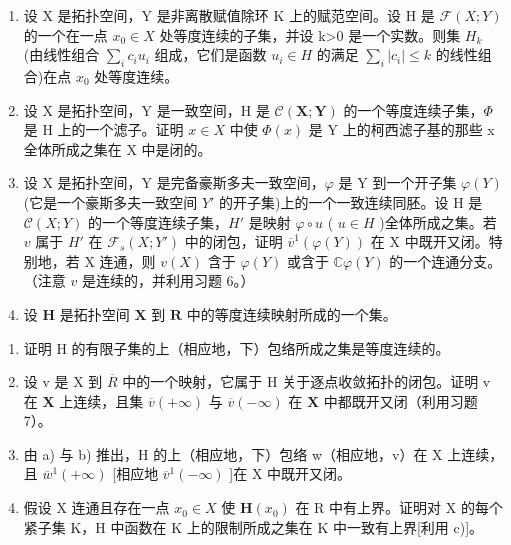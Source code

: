 \begin{enumerate}
\def\labelenumi{\arabic{enumi})}
\setcounter{enumi}{4}
\item
  设 X 是拓扑空间，Y 是非离散赋值除环 K 上的赋范空间。设 H 是 \(\mathcal{F}(X;Y)\) 的一个在一点 \(x_{0}\in X\) 处等度连续的子集，并设 k\textgreater0 是一个实数。则集 \(H_{k}\) (由线性组合 \(\sum_{i}c_{i}u_{i}\) 组成，它们是函数 \(u_{i}\in H\) 的满足 \(\sum_{i}|c_{i}|\leqslant k\) 的线性组合)在点 \(x_{0}\) 处等度连续。
\item
  设 X 是拓扑空间，Y 是一致空间，H 是 \(\mathcal{C}(\mathbf{X};\mathbf{Y})\) 的一个等度连续子集，\(\Phi\) 是 H 上的一个滤子。证明 \(x\in X\) 中使 \(\Phi(x)\) 是 Y 上的柯西滤子基的那些 x 全体所成之集在 X 中是闭的。
\item
  设 X 是拓扑空间，Y 是完备豪斯多夫一致空间，\(\varphi\) 是 Y 到一个开子集 \(\varphi(Y)\) (它是一个豪斯多夫一致空间 \(Y'\) 的开子集)上的一个一致连续同胚。设 H 是 \(\mathcal{C}(X; Y)\) 的一个等度连续子集，\(H'\) 是映射 \(\varphi \circ u\) ( \(u \in H\) )全体所成之集。若 \(v\) 属于 \(H'\) 在 \(\mathcal{F}_s(X; Y')\) 中的闭包，证明 \(\overline{v}^{1}(\varphi(Y))\) 在 X 中既开又闭。特别地，若 X 连通，则 \(v(X)\) 含于 \(\varphi(Y)\) 或含于 \(\mathbb{C}\varphi(Y)\) 的一个连通分支。（注意 \(v\) 是连续的，并利用习题 6。）
\item
  设 \(\mathbf{H}\) 是拓扑空间 \(\mathbf{X}\) 到 \(\mathbf{R}\) 中的等度连续映射所成的一个集。
\end{enumerate}

\begin{enumerate}
\def\labelenumi{\alph{enumi})}
\item
  证明 H 的有限子集的上（相应地，下）包络所成之集是等度连续的。
\item
  设 v 是 X 到 \(\overline{R}\) 中的一个映射，它属于 H 关于逐点收敛拓扑的闭包。证明 v 在 \(\mathbf{X}\) 上连续，且集 \(\overline{v} (+\infty)\) 与 \(\overline{v} (-\infty)\) 在 \(\mathbf{X}\) 中都既开又闭（利用习题 7）。
\item
  由 a) 与 b) 推出，H 的上（相应地，下）包络 w（相应地，v）在 X 上连续，且 \(\overline{w}^{1}(+\infty)\) {[}相应地 \(\overline{v}^{1}(-\infty)\) {]}在 X 中既开又闭。
\item
  假设 X 连通且存在一点 \(x_{0} \in X\) 使 \(\mathbf{H}(x_{0})\) 在 R 中有上界。证明对 X 的每个紧子集 K，H 中函数在 K 上的限制所成之集在 K 中一致有上界{[}利用 c){]}。
\end{enumerate}

